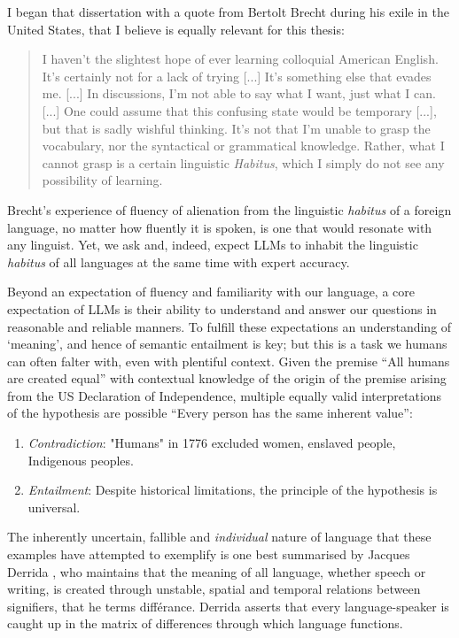 \documentclass[12pt,twoside]{report}
\begin{document}
I began that dissertation with a quote from Bertolt Brecht during his exile in the United States, that I believe is equally relevant for this thesis:
\begin{quote}
    I haven't the slightest hope of ever learning colloquial American English. It's certainly not for a lack of trying [...] It's something else that evades me. [...] In discussions, I'm not able to say what I want, just what I can. [...] One could assume that this confusing state would be temporary [...], but that is sadly wishful thinking. It's not that I'm unable to grasp the vocabulary, nor the syntactical or grammatical knowledge. Rather, what I cannot grasp is a certain linguistic \textit{Habitus}, which I simply do not see any possibility of learning.\cite{brecht}
\end{quote}

Brecht's experience of fluency of alienation from the linguistic \textit{habitus} of a foreign language, no matter how fluently it is spoken, is one that would resonate with any linguist. Yet, we ask and, indeed, expect LLMs to inhabit the linguistic \textit{habitus} of all languages at the same time with expert accuracy. \newline \par

Beyond an expectation of fluency and familiarity with our language, a core expectation of LLMs is their ability to understand and answer our questions in reasonable and reliable manners. To fulfill these expectations an understanding of `meaning', and hence of semantic entailment is key; but this is a task we humans can often falter with, even with plentiful context. Given the premise ``All humans are created equal'' with contextual knowledge of the origin of the premise arising from the US Declaration of Independence, multiple equally valid interpretations of the hypothesis are possible ``Every person has the same inherent value'':
\begin{enumerate}
    \item \textit{Contradiction}: "Humans" in 1776 excluded women, enslaved people, Indigenous peoples.
    \item \textit{Entailment}: Despite historical limitations, the principle of the hypothesis is universal.
\end{enumerate}

The inherently uncertain, fallible and \textit{individual} nature of language that these examples have attempted to exemplify is one best summarised by Jacques Derrida \cite{derrida1, derrida2, derrida3}, who maintains that the meaning of all language, whether speech or writing, is created through unstable, spatial and temporal relations between signifiers, that he terms différance. Derrida asserts that every language-speaker is caught up in the matrix of differences through which language functions. \newline \par
\end{document}
